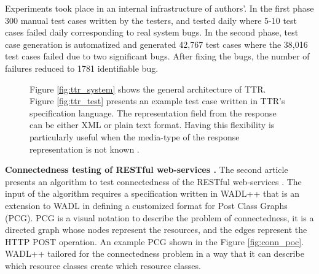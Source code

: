 \documentclass[english]{tktltiki}
\begin{document}
Experiments took place in an internal infrastructure of authors'. In the first phase 300 manual test cases written by the testers, and tested daily where 5-10 test cases failed daily corresponding to real system bugs. In the second phase, test case generation is automatized and generated 42,767 test cases where the 38,016 test cases failed due to two significant bugs. After fixing the bugs, the number of failures reduced to 1781 identifiable bug. 
\begin{figure}[h]
	\centering
	\hfill%
	\caption{Figure \ref{fig:ttr_system} shows the general architecture of TTR. Figure \ref{fig:ttr_test} presents an example test case written in TTR's specification language. The representation field from the response can be either XML or plain text format. Having this flexibility is particularly useful when the media-type of the response representation is not known \cite{chakrabarti2009test}.}
\end{figure}

\textbf{Connectedness testing of RESTful web-services \cite{chakrabarti2010connectedness}.} The second article presents an algorithm to test connectedness of the RESTful web-services \cite{chakrabarti2010connectedness}. The input of the algorithm requires a specification written in WADL++ that is an extension to WADL in defining a customized format for Post Class Graphs (PCG). PCG is a visual notation to describe the problem of connectedness, it is a directed graph whose nodes represent the resources, and the edges represent the HTTP POST operation. An example PCG shown in the Figure \ref{fig:conn_poc}. WADL++ tailored for the connectedness problem in a way that it can describe which resource classes create which resource classes.
\end{document}
